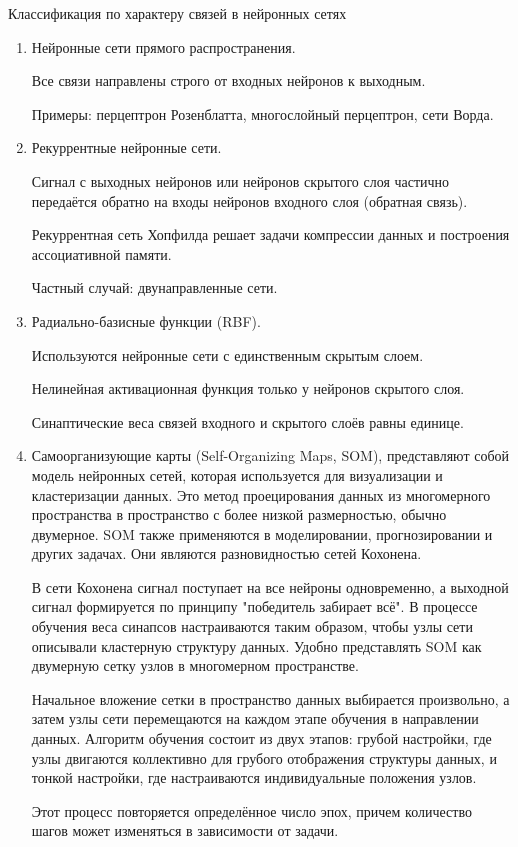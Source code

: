 Классификация по характеру связей в нейронных сетях
\begin{enumerate}
\item   Нейронные сети прямого распространения.

	Все связи направлены строго от входных нейронов к выходным.

	Примеры: перцептрон Розенблатта, многослойный перцептрон, сети Ворда.

\item Рекуррентные нейронные сети.

	Сигнал с выходных нейронов или нейронов скрытого слоя частично передаётся обратно на входы нейронов входного слоя (обратная связь).
	
	Рекуррентная сеть Хопфилда решает задачи компрессии данных и построения ассоциативной памяти.
	
	Частный случай: двунаправленные сети.
	
 \item Радиально-базисные функции (RBF).

	Используются нейронные сети с единственным скрытым слоем.
	
	Нелинейная активационная функция только у нейронов скрытого слоя.
	
	Синаптические веса связей входного и скрытого слоёв равны единице.
\item Самоорганизующие карты (Self-Organizing Maps, SOM), представляют собой модель нейронных сетей, которая используется для визуализации и кластеризации данных. Это метод проецирования данных из многомерного пространства в пространство с более низкой размерностью, обычно двумерное. SOM также применяются в моделировании, прогнозировании и других задачах. Они являются разновидностью сетей Кохонена.

В сети Кохонена сигнал поступает на все нейроны одновременно, а выходной сигнал формируется по принципу "победитель забирает всё". В процессе обучения веса синапсов настраиваются таким образом, чтобы узлы сети описывали кластерную структуру данных. Удобно представлять SOM как двумерную сетку узлов в многомерном пространстве.

Начальное вложение сетки в пространство данных выбирается произвольно, а затем узлы сети перемещаются на каждом этапе обучения в направлении данных. Алгоритм обучения состоит из двух этапов: грубой настройки, где узлы двигаются коллективно для грубого отображения структуры данных, и тонкой настройки, где настраиваются индивидуальные положения узлов.

Этот процесс повторяется определённое число эпох, причем количество шагов может изменяться в зависимости от задачи.
\end{enumerate}


